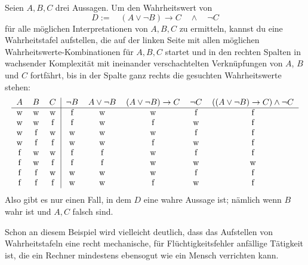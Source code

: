 \begin{bsp}
    Seien $A,B,C$ drei Aussagen. Um den Wahrheitswert von
        \[ D:= \quad (A\lor \neg B) \to C\quad \land\quad \neg C\]
    für alle möglichen Interpretationen von $A,B,C$ zu ermitteln, kannst du eine Wahrheitstafel aufstellen, die auf der linken Seite mit allen möglichen Wahrheitswerte-Kombinationen für $A,B,C$ startet und in den rechten Spalten in wachsender Komplexität mit ineinander verschachtelten Verknüpfungen von $A$, $B$ und $C$ fortfährt, bis in der Spalte ganz rechts die gesuchten Wahrheitswerte stehen:
    \[\begin{tabular}{ccc|ccccc}
        $A$ & $B$ & $C$ & $\neg B$ & $A\lor \neg B$ & $(A\lor \neg B)\to C$ & $\neg C$ & $((A\lor \neg B) \to C)\land \neg C$ \\
        \hline
        w & w & w & f & w & w & f & f\\
        w & w & f & f & w & f & w & f\\
        w & f & w & w & w & w & f & f\\
        w & f & f & w & w & f & w & f\\
        f & w & w & f & f & w & f & f\\
        f & w & f & f & f & w & w & w\\
        f & f & w & w & w & w & f & f\\
        f & f & f & w & w & f & w & f
    \end{tabular}\]
    Also gibt es nur einen Fall, in dem $D$ eine wahre Aussage ist; nämlich wenn $B$ wahr ist und $A,C$ falsch sind.
    
    Schon an diesem Beispiel wird vielleicht deutlich, dass das Aufstellen von Wahrheitstafeln eine recht mechanische, für Flüchtigkeitsfehler anfällige Tätigkeit ist, die ein Rechner mindestens ebensogut wie ein Mensch verrichten kann.
\end{bsp}



